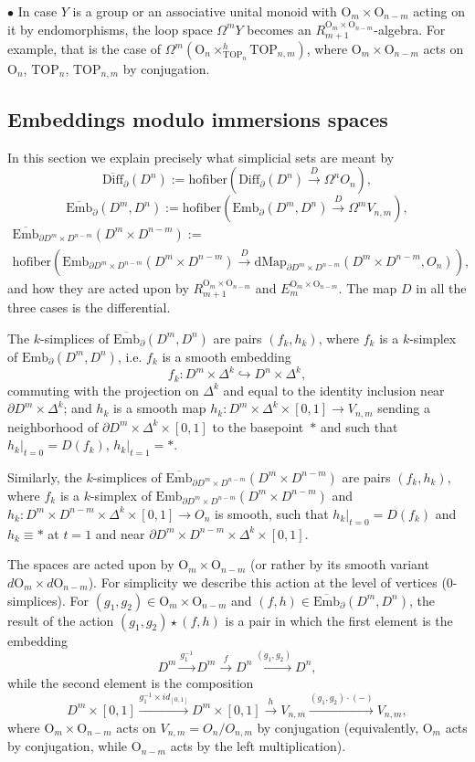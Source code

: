 \documentclass[11pt]{amsart}
\theoremstyle{definition}
\newcommand{\Ebarmn}{{\overline{\mathrm{Emb}}}_\partial(D^m,D^n)}
\newcommand{\Embmn}{\mathrm{Emb}_\partial(D^m,D^n)}
\newcommand{\Ebar}{\overline{\mathrm{Emb}}}
\newcommand{\Emb}{\mathrm{Emb}}
\newcommand{\dMap}{\mathrm{dMap}}
\newcommand{\Diffn}{\mathrm{Diff}_\partial(D^n)}
\newcommand{\Dbarn}{\overline{\mathrm{Diff}}_\partial(D^n)}
\newcommand{\TOP}{\mathrm{TOP}}
\newcommand{\OO}{\mathrm{O}}
\newcommand{\hofiber}{\mathrm{hofiber}}
\numberwithin{equation}{section}
\begin{document}
$\bullet$ In case $Y$ is a group or an associative unital monoid with $\OO_m\times\OO_{n-m}$ acting on it by endomorphisms, the loop space $\Omega^m Y$ becomes an 
 $R_{m+1}^{\OO_m\times\OO_{n-m}}$-algebra. For example, that is the case of $\Omega^m \left( \OO_n\times_{\TOP_n}^h\TOP_{n,m}\right)$,
 where $\OO_m\times\OO_{n-m}$ acts on $\OO_n$, $\TOP_n$, $\TOP_{n,m}$ by conjugation.

\subsection{Embeddings modulo immersions spaces}\label{ss:modulo} 
In this section we explain precisely what simplicial sets are meant by 
\[\Dbarn:=\hofiber\left(\Diffn\xrightarrow{D}\Omega^n O_n\right),
\]
\[
 \Ebarmn:=\hofiber\left(\Embmn\xrightarrow{D}\Omega^mV_{n,m}\right),\]
 \begin{multline*}
 \Ebar_{\partial D^m\times D^{n-m}}(D^m\times D^{n-m}):=\\
 \hofiber\left(\Emb_{\partial D^m\times D^{n-m}}(D^m\times D^{n-m})\xrightarrow{D} \dMap_{\partial D^m\times D^{n-m}}(D^m\times D^{n-m},O_n)\right),
 \end{multline*}
and how they are acted upon by $R_{m+1}^{\OO_m\times\OO_{n-m}}$ and $E_{m}^{\OO_m\times\OO_{n-m}}$. The map $D$ in all the three 
cases is the differential. 

The $k$-simplices of $\Ebarmn$ are pairs $(f_k,h_k)$, where $f_k$ is a $k$-simplex of $\Embmn$, i.e. $f_k$ is a smooth embedding 
\[
f_k\colon D^m\times\Delta^k\hookrightarrow D^n\times\Delta^k,
\]
commuting with the projection on $\Delta^k$ and equal to the identity inclusion near $\partial D^m\times\Delta^k$; and $h_k$ is a smooth map
$h_k\colon D^m\times\Delta^k\times[0,1]\to V_{n,m}$ sending a neighborhood of $\partial D^m\times\Delta^k\times[0,1]$ to the basepoint~$*$ and such that $h_k|_{t=0}=D(f_k)$, $h_k|_{t=1}=*$.

Similarly, the $k$-simplices of $\Ebar_{\partial D^m\times D^{n-m}}(D^m\times D^{n-m})$ are pairs $(f_k,h_k)$, where $f_k$  is a $k$-simplex
of $\Emb_{\partial D^m\times D^{n-m}}(D^m\times D^{n-m})$ and $h_k\colon D^m\times D^{n-m}\times\Delta^k\times [0,1]\to O_n$ is smooth, such that $h_k|_{t=0}=D(f_k)$ and
$h_k\equiv *$ at $t=1$ and near $\partial D^m\times D^{n-m}\times\Delta^k\times[0,1]$.

 The spaces are acted upon by $\OO_m\times\OO_{n-m}$ (or rather by its smooth variant $d\OO_m\times d\OO_{n-m}$). For simplicity we describe this action at the level of vertices (0-simplices). For $(g_1,g_2)\in\OO_m\times\OO_{n-m}$ and $(f,h)\in\Ebarmn$, the result of the action $(g_1,g_2)\star (f,h)$ is a pair in which the first element is the embedding
 \[
 D^m\xrightarrow{g_1^{-1}}D^m\xrightarrow{f}D^n\xrightarrow{(g_1,g_2)} D^n,
 \]
 while the second element is the composition
 \[
 D^m\times [0,1]\xrightarrow{g_1^{-1}\times id_{[0,1]}}D^m\times [0,1]\xrightarrow{h} V_{n,m}\xrightarrow{(g_1,g_2)\cdot(-)}V_{n,m},
 \]
 where $\OO_m\times\OO_{n-m}$ acts on $V_{n,m}=O_n/O_{n,m}$ by conjugation (equivalently, $\OO_m$ acts by conjugation, while $\OO_{n-m}$
 acts by the left multiplication).
\end{document}

